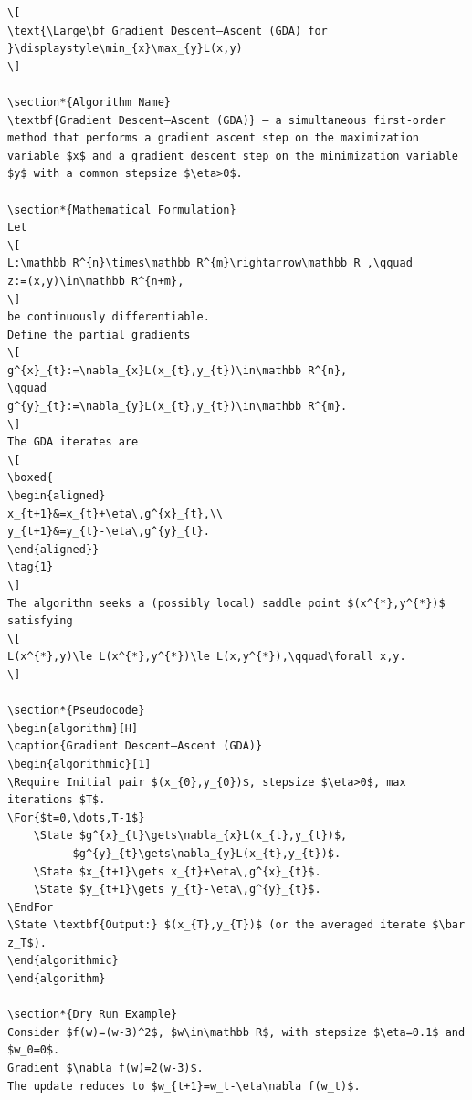 {{\begin{verbatim}
\[
\text{\Large\bf Gradient Descent–Ascent (GDA) for }\displaystyle\min_{x}\max_{y}L(x,y)
\]

\section*{Algorithm Name}
\textbf{Gradient Descent–Ascent (GDA)} – a simultaneous first‑order method that performs a gradient ascent step on the maximization variable $x$ and a gradient descent step on the minimization variable $y$ with a common stepsize $\eta>0$.

\section*{Mathematical Formulation}
Let 
\[
L:\mathbb R^{n}\times\mathbb R^{m}\rightarrow\mathbb R ,\qquad
z:=(x,y)\in\mathbb R^{n+m},
\]
be continuously differentiable.  
Define the partial gradients 
\[
g^{x}_{t}:=\nabla_{x}L(x_{t},y_{t})\in\mathbb R^{n},
\qquad 
g^{y}_{t}:=\nabla_{y}L(x_{t},y_{t})\in\mathbb R^{m}.
\]
The GDA iterates are 
\[
\boxed{
\begin{aligned}
x_{t+1}&=x_{t}+\eta\,g^{x}_{t},\\
y_{t+1}&=y_{t}-\eta\,g^{y}_{t}.
\end{aligned}}
\tag{1}
\]
The algorithm seeks a (possibly local) saddle point $(x^{*},y^{*})$ satisfying 
\[
L(x^{*},y)\le L(x^{*},y^{*})\le L(x,y^{*}),\qquad\forall x,y.
\]

\section*{Pseudocode}
\begin{algorithm}[H]
\caption{Gradient Descent–Ascent (GDA)}
\begin{algorithmic}[1]
\Require Initial pair $(x_{0},y_{0})$, stepsize $\eta>0$, max iterations $T$.
\For{$t=0,\dots,T-1$}
    \State $g^{x}_{t}\gets\nabla_{x}L(x_{t},y_{t})$,
          $g^{y}_{t}\gets\nabla_{y}L(x_{t},y_{t})$.
    \State $x_{t+1}\gets x_{t}+\eta\,g^{x}_{t}$.
    \State $y_{t+1}\gets y_{t}-\eta\,g^{y}_{t}$.
\EndFor
\State \textbf{Output:} $(x_{T},y_{T})$ (or the averaged iterate $\bar z_T$).
\end{algorithmic}
\end{algorithm}

\section*{Dry Run Example}
Consider $f(w)=(w-3)^2$, $w\in\mathbb R$, with stepsize $\eta=0.1$ and $w_0=0$.  
Gradient $\nabla f(w)=2(w-3)$.  
The update reduces to $w_{t+1}=w_t-\eta\nabla f(w_t)$.  


\end{verbatim}}}
